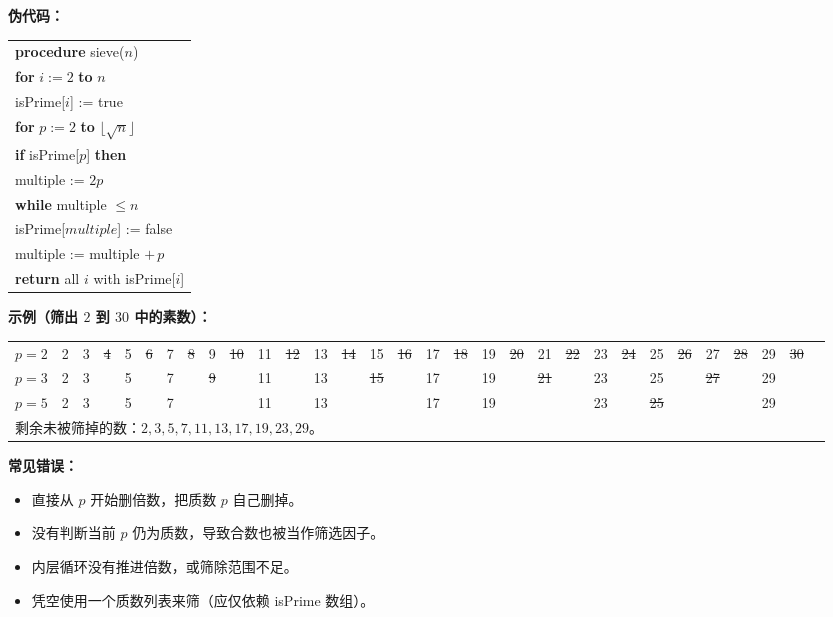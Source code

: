 \documentclass[11pt,UTF8]{article}
\begin{document}
\textbf{伪代码：}
\begin{center}
\begin{tabular}{l}
\hline
\textbf{procedure} sieve($n$)\\
\quad \textbf{for} $i:=2$ \textbf{to} $n$\\
\quad\quad isPrime[$i$] := true\\
\quad \textbf{for} $p:=2$ \textbf{to} $\lfloor\sqrt{n}\rfloor$\\
\quad\quad \textbf{if} isPrime[$p$] \textbf{then}\\
\quad\quad\quad multiple := $2p$\\
\quad\quad\quad \textbf{while} multiple $\le n$\\
\quad\quad\quad\quad isPrime[$multiple$] := false\\
\quad\quad\quad\quad multiple := multiple $+\,p$\\
\quad \textbf{return} all $i$ with isPrime[$i$]\\
\hline
\end{tabular}
\end{center}

\textbf{示例（筛出 $2$ 到 $30$ 中的素数）：}

\begin{center}
\begin{tabular}{c|cccccccccccccccccccccccccccccc}
\hline
$p=2$ & 2 & 3 & \sout{4} & 5 & \sout{6} & 7 & \sout{8} & 9 & \sout{10} & 11 & \sout{12} & 13 & \sout{14} & 15 & \sout{16} & 17 & \sout{18} & 19 & \sout{20} & 21 & \sout{22} & 23 & \sout{24} & 25 & \sout{26} & 27 & \sout{28} & 29 & \sout{30} \\
$p=3$ & 2 & 3 &  & 5 &  & 7 &  & \sout{9} &  & 11 &  & 13 &  & \sout{15} &  & 17 &  & 19 &  & \sout{21} &  & 23 &  & 25 &  & \sout{27} &  & 29 &  \\
$p=5$ & 2 & 3 &  & 5 &  & 7 &  &  &  & 11 &  & 13 &  &  &  & 17 &  & 19 &  &  &  & 23 &  & \sout{25} &  &  &  & 29 &  \\
\hline
\multicolumn{30}{l}{剩余未被筛掉的数：$2,3,5,7,11,13,17,19,23,29$。} \\
\hline
\end{tabular}
\end{center}

\textbf{常见错误：}
\begin{itemize}
    \item 直接从 $p$ 开始删倍数，把质数 $p$ 自己删掉。
    \item 没有判断当前 $p$ 仍为质数，导致合数也被当作筛选因子。
    \item 内层循环没有推进倍数，或筛除范围不足。
    \item 凭空使用一个质数列表来筛（应仅依赖 isPrime 数组）。
\end{itemize}
\end{document}
